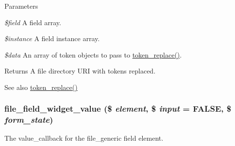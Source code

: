 \begin{DoxyParams}{Parameters}
\item[{\em \$field}]A field array. \item[{\em \$instance}]A field instance array. \item[{\em \$data}]An array of token objects to pass to \hyperlink{includes_2token_8inc_a47eb294b05ca8d04439a9a82ccc4d82a}{token\_\-replace()}.\end{DoxyParams}
\begin{DoxyReturn}{Returns}
A file directory URI with tokens replaced.
\end{DoxyReturn}
\begin{DoxySeeAlso}{See also}
\hyperlink{includes_2token_8inc_a47eb294b05ca8d04439a9a82ccc4d82a}{token\_\-replace()} 
\end{DoxySeeAlso}
\hypertarget{file_8field_8inc_a2ddca1a735dd1b46522285ebe3b5ca93}{
\subsubsection[{file\_\-field\_\-widget\_\-value}]{\setlength{\rightskip}{0pt plus 5cm}file\_\-field\_\-widget\_\-value (\$ {\em element}, \/  \$ {\em input} = {\ttfamily FALSE}, \/  \$ {\em form\_\-state})}}
\label{file_8field_8inc_a2ddca1a735dd1b46522285ebe3b5ca93}
The value\_\-callback for the file\_\-generic field element. 
